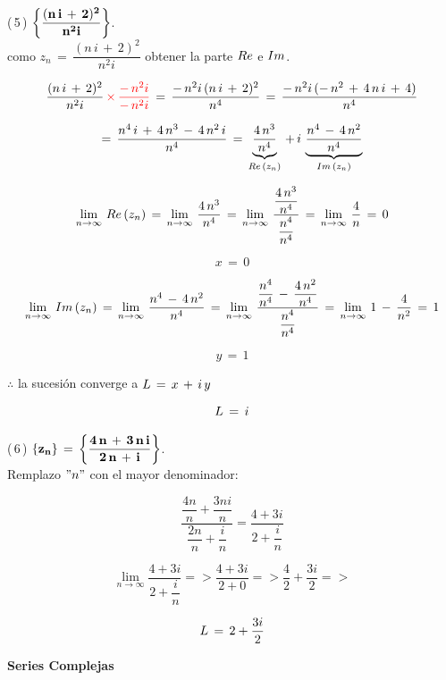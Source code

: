\documentclass[a4paper,11pt,openany]{book}
\begin{document}
\textcolor{ao(english)}{(\,5\,)} $\bf{\left\{\dfrac{(n\,i\,+\,2)^{2}}{n^{2}i}\right\}}$.\\

\textcolor{ao(english)}{} como $z_{n}\,=\,\dfrac{(n\,i\,+\,2)^{2}}{n^{2}i}$ obtener la parte $\mathnormal{Re}$ e $\mathnormal{Im}$.

$$\dfrac{(n\,i\,+\,2)^{2}}{n^{2}i}\,\textcolor{red}{\times\,\dfrac{-\,n^{2}i}{-\,n^{2}i}}\,=\,\dfrac{-\,n^{2}i\,(n\,i\,+\,2)^{2}}{n^{4}}\,=\,\dfrac{-\,n^{2}i\,(-\,n^{2}\,+\,4\,n\,i\,+\,4)}{n^{4}}$$

$$=\,\dfrac{n^{4}\,i\,+\,4\,n^{3}\,-\,4\,n^{2}\,i}{n^{4}}\,=\,\underbrace{\dfrac{4\,n^{3}}{n^{4}}}_{\mathnormal{Re}\,(z_{n})}\,+\,i\,\underbrace{\dfrac{n^{4}\,-\,4\,n^{2}}{n^{4}}}_{\mathnormal{Im}\,(z_{n})}$$

$$\displaystyle\lim_{n \to \infty}\,\mathnormal{Re}\,(z_{n})\,=\,\displaystyle\lim_{n \to \infty}\,\dfrac{4\,n^{3}}{n^{4}}\,=\,\displaystyle\lim_{n \to \infty}\,\dfrac{\dfrac{4\,n^{3}}{n^{4}}}{\dfrac{n^{4}}{n^{4}}}\,=\,\displaystyle\lim_{n \to \infty}\,\dfrac{4}{n}\,=\,0$$

$$x\,=\,0$$

$$\displaystyle\lim_{n \to \infty}\,\mathnormal{Im}\,(z_{n})\,=\,\displaystyle\lim_{n \to \infty}\,\dfrac{n^{4}\,-\,4\,n^{2}}{n^{4}}\,=\,\displaystyle\lim_{n \to \infty}\,\dfrac{\dfrac{n^{4}}{n^{4}}\,-\,\dfrac{4\,n^{2}}{n^{4}}}{\dfrac{n^{4}}{n^{4}}}\,=\,\displaystyle\lim_{n \to \infty}\,1\,-\,\dfrac{4}{n^{2}}\,=\,1$$

$$y\,=\,1$$

$\therefore$ la sucesión converge a $\mathnormal{L}\,=\,x\,+\,i\,y$

$$\mathnormal{L}\,=\,i$$

\textcolor{ao(english)}{(\,6\,)} $\bf{\{z_{n}\}\,=\,\left\{\dfrac{4\,n\,+\,3\,n\,i}{2\,n\,+\,i}\right\}}$.\\

Remplazo $"n"$ con el mayor denominador:

$$\dfrac{\dfrac{4n}{n}+\dfrac{3ni}{n}}{\dfrac{2n}{n}+\dfrac{i}{n}} = \dfrac{ 4 +3i }{2+\dfrac{i}{n}} $$

$$\displaystyle\lim_{n \to \infty} \dfrac{ 4 +3i }{2+\dfrac{i}{n}} => \dfrac{ 4 +3i }{2+0} => \dfrac{4}{2}+\dfrac{3i}{2} =>  $$

$$\mathnormal{L}\,=\, 2+\dfrac{3i}{2}$$

\begin{center}
\textbf{Series Complejas}
\end{center}
\end{document}
